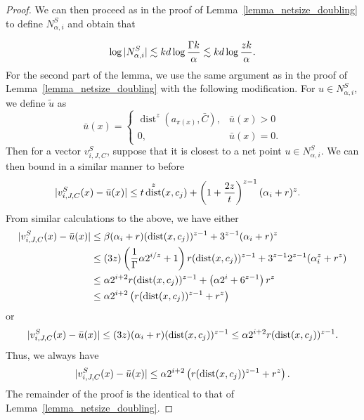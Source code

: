 \documentclass[11pt,letterpaper]{article}
\theoremstyle{definition}
\DeclareMathOperator{\dist}{dist}
\DeclarePairedDelimiter{\abs}{\lvert}{\rvert}
\begin{document}
\begin{proof}
We can then proceed as in the proof of Lemma~\ref{lemma_netsize_doubling} to define $N_{\alpha,i}^S$ and obtain that 

\[
    \log{\abs{N_{\alpha,i}^S}}\lesssim kd\log{\frac{\Gamma k}{\alpha}} \lesssim kd\log{\frac{z k}{\alpha}}.
\]
For the second part of the lemma, we use the same argument as in the proof of Lemma~\ref{lemma_netsize_doubling} with the following modification. For $u\in N_{\alpha,i}^S$, we define $\tilde{u}$ as
    \[
        \bar{u}(x) = \begin{cases}
                    \dist^z(a_{\pi(x)}, \bar{C}),  & \bar{u}(x) > 0 \\
                    0,                      & \bar{u}(x) = 0.
                  \end{cases}
    \]
    Then for a vector $v_{i,J,C}^S$, suppose that it is closest to a net point $u\in N_{\alpha, i}^S$. We can then bound in a similar manner to before
    \begin{align*}
        \abs{v_{i,J,C}^S(x) - \bar{u}(x)} &\leq t\dist^z(x,c_j) + \left(1 + \frac{2z}{t}\right)^{z-1}(\alpha_i + r)^{z}.
    \end{align*}
    From similar calculations to the above, we have either
    \begin{align*}
        \abs{v_{i,J,C}^S(x) - \bar{u}(x)} 
        &\leq \beta (\alpha_i+r) (\dist(x,c_j))^{z-1} + 3^{z-1} (\alpha_i+r)^z \\
        &\leq (3z)\left(\frac{1}{\Gamma} \alpha 2^{i/z} + 1\right)r(\dist(x,c_j))^{z-1} + 3^{z-1}2^{z-1}(\alpha_i^z + r^z) \\
        &\leq \alpha 2^{i+2} r(\dist(x,c_j))^{z-1} + \left(\alpha 2^i + 6^{z-1}\right)r^z \\
        &\leq \alpha 2^{i+2} \left( r(\dist(x,c_j))^{z-1} + r^z\right)
    \end{align*}
    or
    \[
        \abs{v_{i,J,C}^S(x) - \bar{u}(x)}
        \leq (3z)(\alpha_i + r) (\dist(x,c_j))^{z-1}
        \leq \alpha 2^{i+2} r(\dist(x,c_j))^{z-1}.
    \]
    Thus, we always have
    \[
        \abs{v_{i,J,C}^S(x) - \bar{u}(x)}  \leq \alpha 2^{i+2} \left( r(\dist(x,c_j))^{z-1} + r^z\right).
    \]
    The remainder of the proof is the identical to that of Lemma~\ref{lemma_netsize_doubling}.
\end{proof}
\end{document}
